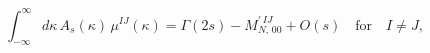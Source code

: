 \begin{equation*}
\int_{-\infty}^{\infty}d\kappa\,A_s(\kappa)\,
\mu^{IJ}(\kappa)=\Gamma(2s)-M_{N,\,00}^{\prime\,IJ}+O(s)\quad\text{for}\quad I\ne J,
\end{equation*}

